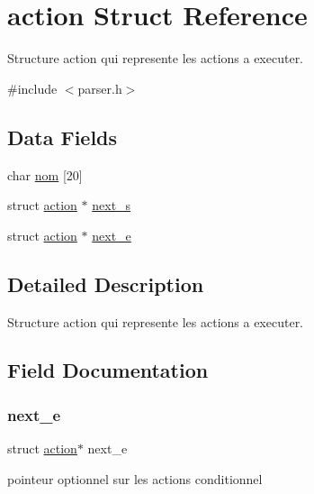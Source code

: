 \hypertarget{structaction}{}\section{action Struct Reference}
\label{structaction}


Structure action qui represente les actions a executer.  




{\ttfamily \#include $<$parser.\+h$>$}

\subsection*{Data Fields}
\begin{DoxyCompactItemize}
\item 
char \mbox{\hyperlink{structaction_aadad624255828e83c18a11df31c8f559}{nom}} \mbox{[}20\mbox{]}
\item 
struct \mbox{\hyperlink{structaction}{action}} $\ast$ \mbox{\hyperlink{structaction_ace6318c2ce65bdd3deeee8e969af6202}{next\+\_\+s}}
\item 
struct \mbox{\hyperlink{structaction}{action}} $\ast$ \mbox{\hyperlink{structaction_a568d20e945887e8bc03494571e0aeb49}{next\+\_\+e}}
\end{DoxyCompactItemize}


\subsection{Detailed Description}
Structure action qui represente les actions a executer. 

\subsection{Field Documentation}
\mbox{\label{structaction_a568d20e945887e8bc03494571e0aeb49}} 
\subsubsection{\texorpdfstring{next\_e}{next\_e}}
{\footnotesize\ttfamily struct \mbox{\hyperlink{structaction}{action}}$\ast$ next\+\_\+e}

pointeur optionnel sur les actions conditionnel \mbox{\label{structaction_ace6318c2ce65bdd3deeee8e969af6202}} 
